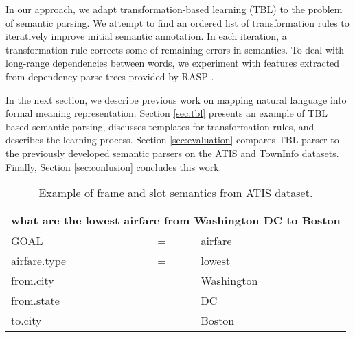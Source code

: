 \documentclass{article}
\begin{document}

In our approach, we adapt transformation-based learning (TBL) \cite{brill95} to the problem of semantic parsing. We attempt to find an ordered list of transformation rules to iteratively improve initial semantic annotation. 
In each iteration, a transformation rule corrects some of remaining errors in semantics.
To deal with long-range dependencies between words, we experiment with features extracted from dependency parse trees provided by RASP \cite{rasp06}.


In the next section, we describe previous work on mapping natural language into formal meaning representation. Section \ref{sec:tbl} presents an example of TBL based semantic parsing, discusses templates for transformation rules, and describes the learning process. Section \ref{sec:evaluation} compares TBL parser to the previously developed semantic parsers on the ATIS \cite{atis94} and TownInfo \cite{mairesse09} datasets. Finally, Section \ref{sec:conlusion} concludes this work.

\begin{table}
\begin{center}
\begin{tabular}{lll} 
  \multicolumn{3}{l}{what are the lowest airfare from Washington DC to Boston} \\
  \hline
  GOAL          & = & airfare \\
  airfare.type  & = & lowest \\
  from.city     & = & Washington \\
  from.state    & = & DC \\
  to.city       & = & Boston \\
\end{tabular} 
\end{center}
\vspace{-0.5cm}
\caption{Example of frame and slot semantics from ATIS \cite{atis94} dataset.}
\label{tbl:sem:example}
\end{table}
\end{document}
